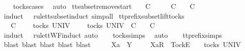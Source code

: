 \begin{isabellebody}
\ \ \isamarkupfalse%
\ tocks{\isachardot}cases\ \isamarkupfalse%
\ auto%
\endisatagproof
{\isafoldproof}%
%
\isadelimproof
\isanewline
%
\endisadelimproof
\isanewline
{}\isamarkupfalse%
\ tt{\isacharunderscore}subset{\isacharunderscore}remove{\isacharunderscore}start{\isacharcolon}\ {\isachardoublequoteopen}{\isasymrho}{\isacharprime}\ {\isacharat}\ {\isasymsigma}{\isacharprime}\ {\isasymsubseteq}\isactrlsub C\ {\isasymrho}\ {\isacharat}\ {\isasymsigma}\ {\isasymLongrightarrow}\ {\isasymrho}{\isacharprime}\ {\isasymsubseteq}\isactrlsub C\ {\isasymrho}\ {\isasymLongrightarrow}\ {\isasymsigma}{\isacharprime}\ {\isasymsubseteq}\isactrlsub C\ {\isasymsigma}{\isachardoublequoteclose}\isanewline
%
\isadelimproof
\ \ %
\endisadelimproof
%
\isatagproof
{}\isamarkupfalse%
\ {\isacharparenleft}induct\ {\isasymrho}{\isacharprime}\ {\isasymrho}\ rule{\isacharcolon}tt{\isacharunderscore}subset{\isachardot}induct{\isacharcomma}\ simp{\isacharunderscore}all{\isacharparenright}%
\endisatagproof
{\isafoldproof}%
%
\isadelimproof
\isanewline
%
\endisadelimproof
\isanewline
{}\isamarkupfalse%
\ tt{\isacharunderscore}prefix{\isacharunderscore}subset{\isacharunderscore}lift{\isacharunderscore}tocks{\isacharcolon}\isanewline
\ \ {\isachardoublequoteopen}{\isasymrho}\ {\isasymlesssim}\isactrlsub C\ {\isasymsigma}\ {\isasymLongrightarrow}\ {\isasymrho}\ {\isasymin}\ tocks\ UNIV\ {\isasymLongrightarrow}\ {\isasymexists}\ {\isasymrho}{\isacharprime}\ {\isasymin}\ tocks\ UNIV{\isachardot}\ {\isasymrho}\ {\isasymlesssim}\isactrlsub C\ {\isasymrho}{\isacharprime}\ {\isasymand}\ {\isasymrho}{\isacharprime}\ {\isasymle}\isactrlsub C\ {\isasymsigma}{\isachardoublequoteclose}\isanewline
%
\isadelimproof
\ \ %
\endisadelimproof
%
\isatagproof
{}\isamarkupfalse%
\ {\isacharparenleft}induct\ {\isasymrho}\ {\isasymsigma}\ rule{\isacharcolon}ttWF{}{\isachardot}induct{\isacharcomma}\ auto{\isacharparenright}\isanewline
\ \ \isamarkupfalse%
\ tocks{\isachardot}simps\ \isamarkupfalse%
\ auto\isanewline
\ \ \isamarkupfalse%
\ tt{\isacharunderscore}prefix{\isachardot}simps\ \isamarkupfalse%
\ {\isacharparenleft}blast{\isacharcomma}\ blast{\isacharcomma}\ blast{\isacharcomma}\ blast{\isacharcomma}\ blast{\isacharparenright}\isanewline
{}\isamarkupfalse%
\ {\isacharminus}\isanewline
\ \ \isamarkupfalse%
\ Xa\ {\isasymrho}\ Y\ {\isasymsigma}\isanewline
\ \ \isamarkupfalse%
\ {\isachardoublequoteopen}{\isacharbrackleft}Xa{\isacharbrackright}\isactrlsub R\ {\isacharhash}\ {\isacharbrackleft}Tock{\isacharbrackright}\isactrlsub E\ {\isacharhash}\ {\isasymrho}\ {\isasymin}\ tocks\ UNIV{\isachardoublequoteclose}\isanewline

\end{isabellebody}

